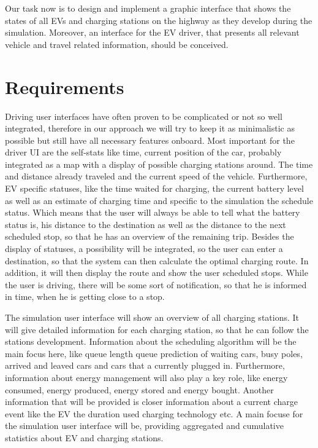 \documentclass{sig-alternate}
\begin{document}
Our task now is to design and implement a graphic interface that shows the states of all EVs and charging stations on
the highway as they develop during the simulation. Moreover, an interface for the EV driver, that presents all
relevant vehicle and travel related information, should be conceived.


\section{Requirements}

Driving user interfaces have often proven to be complicated or not so well integrated, therefore in our approach we
will try to keep it as minimalistic as possible but still have all necessary features onboard. Most important for the
driver UI are the self-stats like time, current position of the car, probably integrated as a map with a display of
possible charging stations around. The time and distance already traveled and the current speed of the vehicle.
Furthermore, EV specific statuses, like the time waited for charging, the current battery level as well as an
estimate of charging time and specific to the simulation the schedule status. Which means that the user will always
be able to tell what the battery status is, his distance to the destination as well as the distance to the next
scheduled stop, so that he has an overview of the remaining trip. Besides the display of statuses, a possibility
will be integrated, so the user can enter a destination, so that the system can then calculate the optimal charging
route. In addition, it will then display the route and show the user scheduled stops. While the user is driving,
there will be some sort of notification, so that he is informed in time, when he is getting close to a stop.

The simulation user interface will show an overview of all charging stations. It will give detailed information for
each charging station, so that he can follow the stations development. Information about the scheduling algorithm
will be the main focus here, like queue length queue prediction of waiting cars, busy poles, arrived and leaved cars
and cars that a currently plugged in. Furthermore, information about energy management will also play a key role,
like energy consumed, energy produced, energy stored and energy bought. Another information that will be provided is
closer information about a current charge event like the EV the duration used charging technology etc. A main focuse
for the simulation user interface will be, providing aggregated and cumulative statistics about EV and charging
stations.
\end{document}
